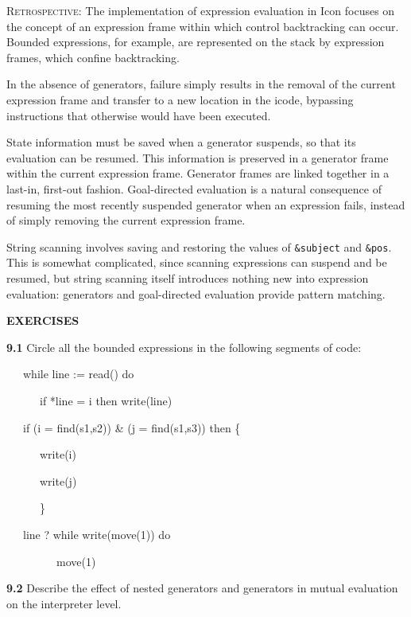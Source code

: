 \textsc{Retrospective}: The implementation of expression evaluation in
Icon focuses on the concept of an expression frame within which
control backtracking can occur. Bounded expressions, for example, are
represented on the stack by expression frames, which confine
backtracking.

In the absence of generators, failure simply results in the removal of
the current expression frame and transfer to a new location in the
icode, bypassing instructions that otherwise would have been executed.

State information must be saved when a generator suspends, so that its
evaluation can be resumed. This information is preserved in a
generator frame within the current expression frame. Generator frames
are linked together in a last-in, first-out fashion. Goal-directed
evaluation is a natural consequence of resuming the most recently
suspended generator when an expression fails, instead of simply
removing the current expression frame.

String scanning involves saving and restoring the values of
\texttt{\&subject} and \texttt{\&pos}. This is somewhat complicated,
since scanning expressions can suspend and be resumed, but string
scanning itself introduces nothing new into expression evaluation:
generators and goal-directed evaluation provide {\textquotedbl}pattern
matching.{\textquotedbl}

\bigskip

\noindent\textbf{EXERCISES}

\textbf{9.1} Circle all the bounded expressions in the following segments of code:

{\ttfamily\mdseries
\ \ \ while line := read() do}

{\ttfamily\mdseries
\ \ \ \ \ \ if *line = i then write(line)}


\bigskip

{\ttfamily\mdseries
\ \ \ if (i = find(s1,s2)) \& (j = find(s1,s3)) then \{}

{\ttfamily\mdseries
\ \ \ \ \ \ write(i)}

{\ttfamily\mdseries
\ \ \ \ \ \ write(j)}

{\ttfamily\mdseries
\ \ \ \ \ \ \}}


\bigskip

{\ttfamily\mdseries
\ \ \ line ? while write(move(1)) do}

{\ttfamily\mdseries
\ \ \ \ \ \ \ \ \ move(1)}


\textbf{9.2} Describe the effect of nested generators and generators in mutual
evaluation on the interpreter level.

